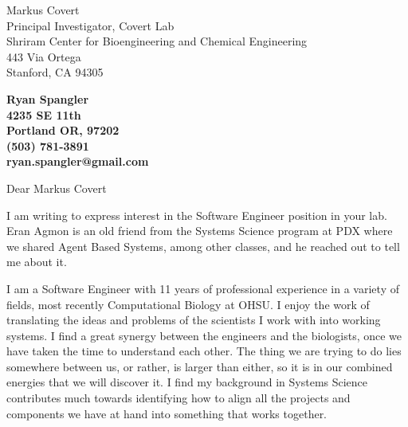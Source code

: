 \documentclass[11pt]{letter} %
\begin{document}

\begin{letter}{Markus Covert \\
Principal Investigator, Covert Lab \\
Shriram Center for Bioengineering and Chemical Engineering \\
443 Via Ortega \\
Stanford, CA 94305}


\begin{center}
\large\bf Ryan Spangler \\
4235 SE 11th \\
Portland OR, 97202 \\
(503) 781-3891 \\
ryan.spangler@gmail.com

\end{center} 
\vfill

\signature{Ryan Spangler} %


\opening{Dear Markus Covert}
 
I am writing to express interest in the Software Engineer position in your lab. Eran Agmon is an old friend from the Systems Science program at PDX where we shared Agent Based Systems, among other classes, and he reached out to tell me about it. 

I am a Software Engineer with 11 years of professional experience in a variety of fields, most recently Computational Biology at OHSU. I enjoy the work of translating the ideas and problems of the scientists I work with into working systems. I find a great synergy between the engineers and the biologists, once we have taken the time to understand each other. The thing we are trying to do lies somewhere between us, or rather, is larger than either, so it is in our combined energies that we will discover it. I find my background in Systems Science contributes much towards identifying how to align all the projects and components we have at hand into something that works together. 


\end{letter}
\end{document}
